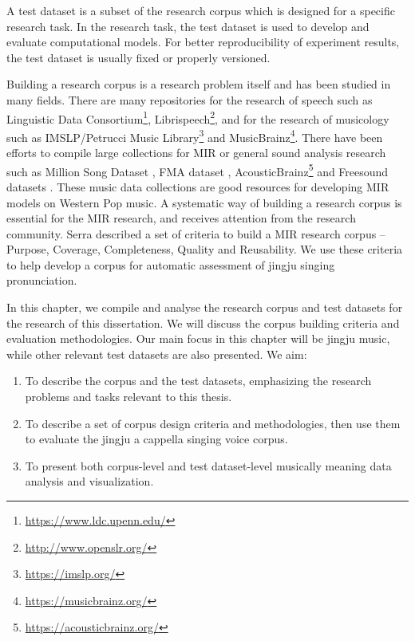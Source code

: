 A test dataset is a subset of the research corpus which is designed for a specific research task. In the research task, the test dataset is used to develop and evaluate computational models. For better reproducibility of experiment results, the test dataset is usually fixed or properly versioned.

Building a research corpus is a research problem itself and has been studied in many fields. There are many repositories for the research of speech such as Linguistic Data Consortium\footnote{\url{https://www.ldc.upenn.edu/}}, Librispeech\footnote{\url{http://www.openslr.org/}}, and for the research of musicology such as IMSLP/Petrucci Music Library\footnote{\url{https://imslp.org/}} and MusicBrainz\footnote{\url{https://musicbrainz.org/}}. There have been efforts to compile large collections for \gls{MIR} or general sound analysis research such as Million Song Dataset \cite{Bertin-Mahieux2011a}, FMA dataset \cite{Defferrard2017}, AcousticBrainz\footnote{\url{https://acousticbrainz.org/}} and Freesound datasets \cite{Fonseca2017}. These music data collections are good resources for developing \gls{MIR} models on Western Pop music. A systematic way of building a research corpus is essential for the \gls{MIR} research, and receives attention from the research community. Serra \cite{Serra2014} described a set of criteria to build a \gls{MIR} research corpus -- Purpose, Coverage, Completeness, Quality and Reusability. We use these criteria to help develop a corpus for automatic assessment of jingju singing pronunciation.

In this chapter, we compile and analyse the research corpus and test datasets for the research of this dissertation. We will discuss the corpus building criteria and evaluation methodologies. Our main focus in this chapter will be jingju music, while other relevant test datasets are also presented. We aim:

\begin{enumerate}[leftmargin=*]
\item To describe the corpus and the test datasets, emphasizing the research problems and tasks relevant to this thesis.
\item To describe a set of corpus design criteria and methodologies, then use them to evaluate the jingju a cappella singing voice corpus.
\item To present both corpus-level and test dataset-level musically meaning data analysis and visualization.
\end{enumerate}

